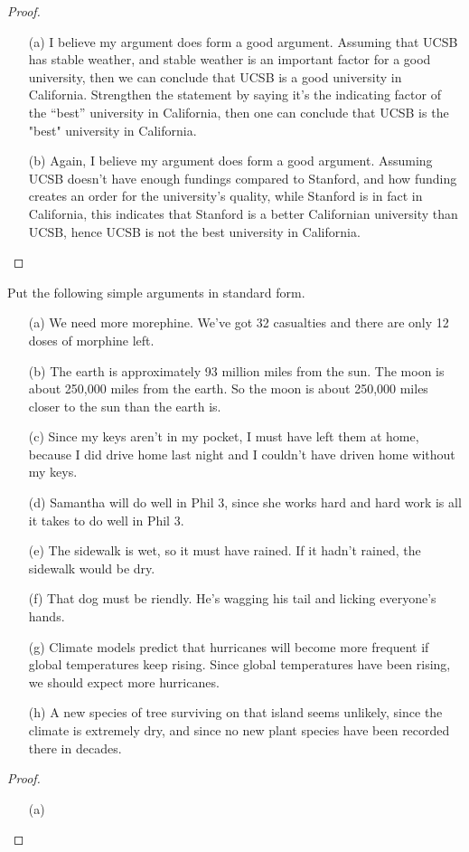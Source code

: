 \documentclass{article}
\begin{document}
\begin{proof}

    \hfil

    \begin{itemize}
        \item[(a)] I believe my argument does form a good argument. Assuming that UCSB has stable weather, and stable weather is an important factor for a good university, then we can conclude that UCSB is a good university in California. Strengthen the statement by saying it's the indicating factor of the ``best'' university in California, then one can conclude that UCSB is the "best" university in California.
        \item[(b)] Again, I believe my argument does form a good argument. Assuming UCSB doesn't have enough fundings compared to Stanford, and how funding creates an order for the university's quality, while Stanford is in fact in California, this indicates that Stanford is a better Californian university than UCSB, hence UCSB is not the best university in California.
    \end{itemize}
\end{proof}

\newpage

\begin{ques}
    Put the following simple arguments in standard form.
    \begin{itemize}
        \item[(a)] We need more morephine. We've got 32 casualties and there are only 12 doses of morphine left.
        \item[(b)] The earth is approximately 93 million miles from the sun. The moon is about 250,000 miles from the earth. So the moon is about 250,000 miles closer to the sun than the earth is.
        \item[(c)] Since my keys aren't in my pocket, I must have left them at home, because I did drive home last night and I couldn't have driven home without my keys.
        \item[(d)] Samantha will do well in Phil 3, since she works hard and hard work is all it takes to do well in Phil 3.
        \item[(e)] The sidewalk is wet, so it must have rained. If it hadn't rained, the sidewalk would be dry.
        \item[(f)] That dog must be riendly. He's wagging his tail and licking everyone's hands.
        \item[(g)] Climate models predict that hurricanes will become more frequent if global temperatures keep rising. Since global temperatures have been rising, we should expect more hurricanes.
        \item[(h)] A new species of tree surviving on that island seems unlikely, since the climate is extremely dry, and since no new plant species have been recorded there in decades.       
    \end{itemize}
\end{ques}\label{q3}

\begin{proof}

    \hfil
    
    \begin{itemize}
        \item[(a)]
    \end{itemize}
\end{proof}
\end{document}
